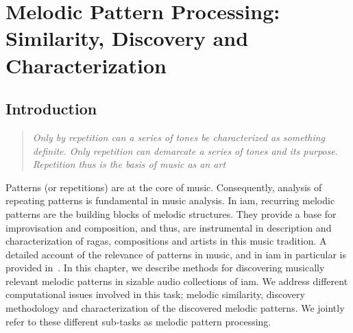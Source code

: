
\chapter{Melodic Pattern Processing: Similarity, Discovery and Characterization}
\label{chap:melodic_pattern_processing}

\section{Introduction}
\label{sec:patterns_introduction}


\blockquote[\cite{schenker1980harmony}]{\textit{Only by repetition can a series of tones be characterized as something definite. Only repetition can demarcate a series of tones and its purpose. Repetition thus is the basis of music as an art}}

Patterns (or repetitions) are at the core of music. Consequently, analysis of repeating patterns is fundamental in music analysis.  In \gls{iam}, recurring melodic patterns are the building blocks of melodic structures. They provide a base for improvisation and composition, and thus, are instrumental in description and characterization of \glspl{raga}, compositions and artists in this music tradition. A detailed account of the relevance of patterns in music, and in \gls{iam} in particular is provided in~. In this chapter, we describe methods for discovering musically relevant melodic patterns in sizable audio collections of \gls{iam}. We address different computational issues involved in this task; melodic similarity, discovery methodology and characterization of the discovered melodic patterns. We jointly refer to these different sub-tasks as melodic pattern processing.

%

